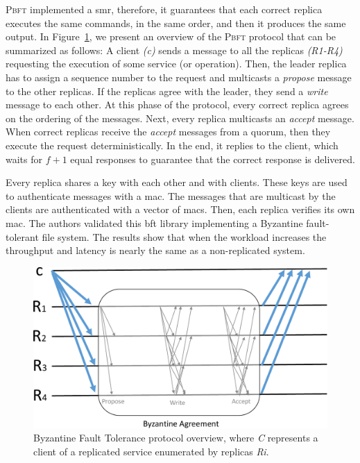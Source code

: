\textsc{Pbft} implemented a \gls{smr}, therefore, it guarantees that each correct replica executes the same commands, in the same order, and then it produces the same output. 
In Figure~\ref{fig:bft}, we present an overview of the \textsc{Pbft} protocol that can be summarized as follows:
A client \emph{(c)} sends a message to all the replicas \emph{(R1-R4)} requesting the execution of some service (or operation).
Then, the leader replica has to assign a sequence number to the request and multicasts a \emph{propose} message to the other replicas. 
If the replicas agree with the leader, they send a \emph{write} message to each other. 
At this phase of the protocol, every correct replica agrees on the ordering of the messages.  
Next, every replica multicasts an \emph{accept} message. 
When correct replicas receive the \emph{accept} messages from a quorum, then they execute the request deterministically. 
In the end, it replies to the client, which waits for $f+1$ equal responses to guarantee that the correct response is delivered.

Every replica shares a key with each other and with clients. 
These keys are used to authenticate messages with a \gls{mac}. 
The messages that are multicast by the clients are authenticated with a vector of \glspl{mac}. 
Then, each replica verifies its own \gls{mac}.
The authors validated this \gls{bft} library implementing a Byzantine fault-tolerant file system. 
The results show that when the workload increases the throughput and latency is nearly the same as a non-replicated system. 

\begin{figure}[h]
\begin{center}
\includegraphics[width=.7\columnwidth]{images/images/bft.pdf}
\caption{Byzantine Fault Tolerance protocol overview, where \emph{C} represents a client of a replicated service enumerated by replicas \emph{Ri}.}
\label{fig:bft}
\end{center}
\end{figure}

